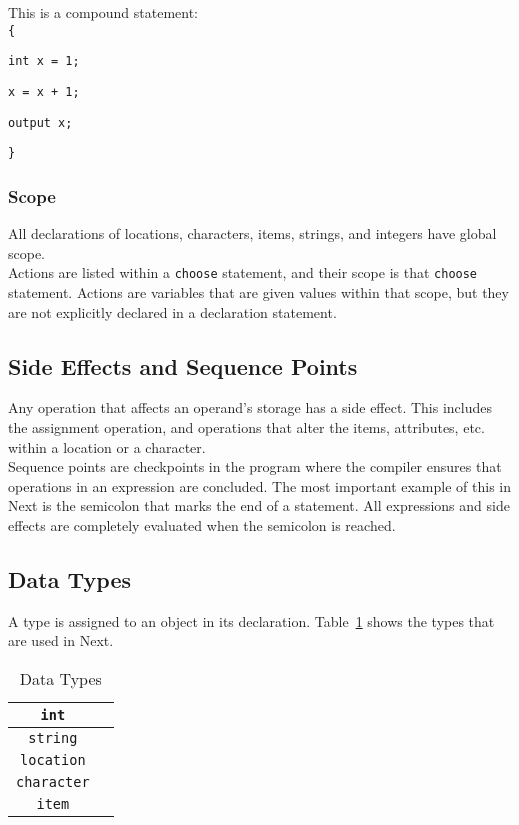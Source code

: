 \documentclass[12pt]{article}
\begin{document}
\noindent This is a compound statement: \\

\texttt{\{}

\indent \indent \texttt{int x = 1;}

\indent \indent \texttt{x = x + 1;}

\indent \indent \texttt{output x;} 

\texttt{\}}

\subsubsection{Scope}
All declarations of locations, characters, items, strings, and integers have global scope.   \\

\noindent Actions are listed within a \texttt{choose} statement, and their scope is that \texttt{choose} statement.  Actions are variables that are given values within that scope, but they are not explicitly declared in a declaration statement.

\subsection{Side Effects and Sequence Points}
Any operation that affects an operand's storage has a side effect.  This includes the assignment operation, and operations that alter the items, attributes, etc. within a location or a character. \\

\noindent Sequence points are checkpoints in the program where the compiler ensures that operations in an expression are concluded.  The most important example of this in Next is the semicolon that marks the end of a statement.  All expressions and side effects are completely evaluated when the semicolon is reached.


\subsection{Data Types}
A type is assigned to an object in its declaration.  Table~\ref{types} shows the types that are used in Next.

\begin{table}[htdp]
\caption{Data Types}
\begin{center}
\begin{tabular}{|c|c|}
\hline
\texttt{int} \\
\hline
\texttt{string} \\
\hline
\texttt{location} \\
\hline
\texttt{character} \\
\hline
\texttt{item} \\
\hline
\end{tabular}
\end{center}
\label{types}
\end{table}%
\end{document}
